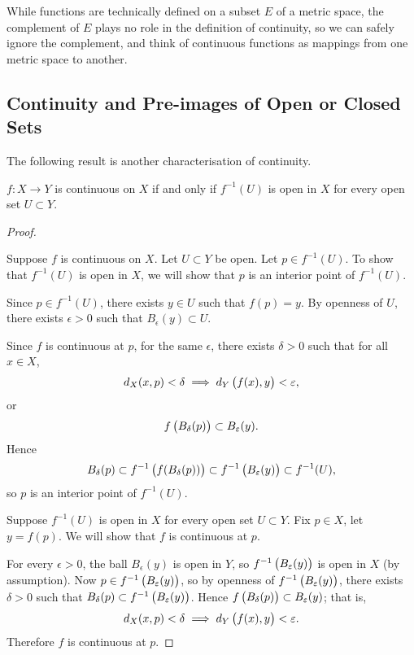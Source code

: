 \begin{notation}
While functions are technically defined on a subset $E$ of a metric space, the complement of $E$ plays no role in the definition of continuity, so we can safely ignore the complement, and think of continuous functions as mappings from one metric space to another. 
\end{notation}
\pagebreak

\subsection{Continuity and Pre-images of Open or Closed Sets}
The following result is another characterisation of continuity.

\begin{proposition}\label{prop:continuity-preimage-open}
$f:X\to Y$ is continuous on $X$ if and only if $f^{-1}(U)$ is open in $X$ for every open set $U\subset Y$.
\end{proposition}

\begin{proof} \

\fbox{$\implies$} Suppose $f$ is continuous on $X$. Let $U\subset Y$ be open. Let $p\in f^{-1}(U)$. To show that $f^{-1}(U)$ is open in $X$, we will show that $p$ is an interior point of $f^{-1}(U)$.

Since $p\in f^{-1}(U)$, there exists $y\in U$ such that $f(p)=y$. By openness of $U$, there exists $\epsilon>0$ such that $B_\epsilon(y)\subset U$. 

Since $f$ is continuous at $p$, for the same $\epsilon$, there exists $\delta>0$ such that for all $x\in X$,
\[d_X(x,p)<\delta\implies d_Y\left(f(x),y\right)<\varepsilon,\]
or
\[f\left(B_\delta(p)\right)\subset B_\varepsilon(y).\]
Hence
\[B_\delta(p)\subset f^{-1}\left(f(B_\delta(p))\right)\subset f^{-1}\left(B_\varepsilon(y)\right)\subset f^{-1}(U),\]
so $p$ is an interior point of $f^{-1}(U)$.

\fbox{$\impliedby$} Suppose $f^{-1}(U)$ is open in $X$ for every open set $U\subset Y$. Fix $p\in X$, let $y=f(p)$. We will show that $f$ is continuous at $p$.

For every $\epsilon>0$, the ball $B_\epsilon(y)$ is open in $Y$, so $f^{-1}\left(B_\varepsilon(y)\right)$ is open in $X$ (by assumption). Now $p\in f^{-1}\left(B_\varepsilon(y)\right)$, so by openness of $f^{-1}\left(B_\varepsilon(y)\right)$, there exists $\delta>0$ such that $B_\delta(p)\subset f^{-1}\left(B_\varepsilon(y)\right)$. Hence $f\left(B_\delta(p)\right)\subset B_\varepsilon(y)$; that is,
\[d_X(x,p)<\delta\implies d_Y\left(f(x),y\right)<\varepsilon.\]
Therefore $f$ is continuous at $p$.
\end{proof}

